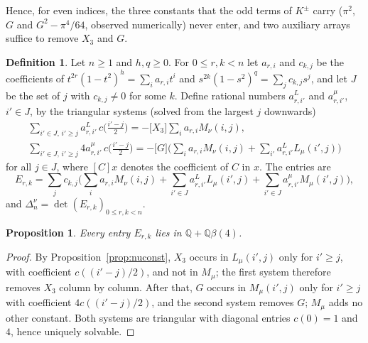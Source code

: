 \documentclass[11pt]{article}
\newtheorem{proposition}[theorem]{Proposition}
\theoremstyle{definition}
\newtheorem{definition}[theorem]{Definition}
\begin{document}
Hence, for even indices, the three constants that the odd terms of $K^\pm$ carry ($\pi^2$, $G$ and $G^2-\pi^4/64$, observed numerically) never enter, and two auxiliary arrays suffice to remove $X_3$ and $G$.

\begin{definition}\label{def:nudet}
Let $n\ge1$ and $h,q\ge0$. For $0\le r,k<n$ let $a_{r,i}$ and $c_{k,j}$ be the coefficients of $t^{2r}(1-t^2)^h=\sum_ia_{r,i}t^i$ and $s^{2k}(1-s^2)^q=\sum_jc_{k,j}s^j$, and let $J$ be the set of $j$ with $c_{k,j}\neq0$ for some $k$. Define rational numbers $a^{L}_{r,i'}$ and $a^{\mu}_{r,i'}$, $i'\in J$, by the triangular systems (solved from the largest $j$ downwards)
\begin{gather*}
\sum_{i'\in J,\,i'\ge j}a^{L}_{r,i'}\,c\big(\tfrac{i'-j}2\big)=-\big[X_3\big]\sum_ia_{r,i}M_\nu(i,j),\\
\sum_{i'\in J,\,i'\ge j}4a^{\mu}_{r,i'}\,c\big(\tfrac{i'-j}2\big)=-\big[G\big]\Big(\sum_ia_{r,i}M_\nu(i,j)+\sum_{i'}a^L_{r,i'}L_\mu(i',j)\Big)
\end{gather*}
for all $j\in J$, where $[C]x$ denotes the coefficient of $C$ in $x$. The entries are
\[
E_{r,k}=\sum_{j}c_{k,j}\Big(\sum_ia_{r,i}M_\nu(i,j)+\sum_{i'\in J}a^L_{r,i'}L_\mu(i',j)+\sum_{i'\in J}a^\mu_{r,i'}M_\mu(i',j)\Big),
\]
and $\Delta^{\nu}_n=\det(E_{r,k})_{0\le r,k<n}$.
\end{definition}

\begin{proposition}\label{prop:nudet}
Every entry $E_{r,k}$ lies in $\mathbb Q+\mathbb Q\beta(4)$.
\end{proposition}

\begin{proof}
By Proposition~\ref{prop:nuconst}, $X_3$ occurs in $L_\mu(i',j)$ only for $i'\ge j$, with coefficient $c((i'-j)/2)$, and not in $M_\mu$; the first system therefore removes $X_3$ column by column. After that, $G$ occurs in $M_\mu(i',j)$ only for $i'\ge j$ with coefficient $4c((i'-j)/2)$, and the second system removes $G$; $M_\mu$ adds no other constant. Both systems are triangular with diagonal entries $c(0)=1$ and $4$, hence uniquely solvable.
\end{proof}
\end{document}
